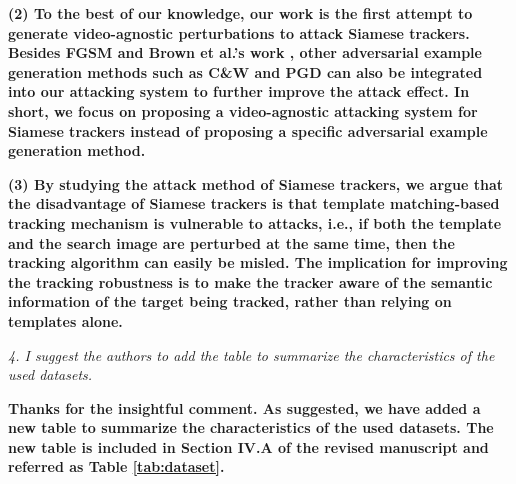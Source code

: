 \documentclass[12pt]{article}
\begin{document}
\textbf{
(2) To the best of our knowledge, our work is the first attempt to generate video-agnostic perturbations to attack Siamese trackers. Besides FGSM \cite{FGSM} and Brown et al.'s work \cite{patch}, other adversarial example generation methods such as C\&W \cite{carlini2017towards} and PGD \cite{PGD} can also be integrated into our attacking system to further improve the attack effect.
In short, we focus on proposing a video-agnostic attacking system for Siamese trackers instead of proposing a specific adversarial example generation method.}

\textbf{
(3) By studying the attack method of Siamese trackers, we argue that the disadvantage of Siamese trackers is that template matching-based tracking mechanism is vulnerable to attacks, i.e., if both the template and the search image are perturbed at the same time, then the tracking algorithm can easily be misled.
The implication for improving the tracking robustness is to make the tracker aware of the semantic information of the target being tracked, rather than relying on templates alone.}

\textit{4. I suggest the authors to add the table to summarize the characteristics of the used datasets.}

\textbf{Thanks for the insightful comment. As suggested, we have added a new table to summarize the characteristics of the used datasets.
The new table is included in Section IV.A of the revised manuscript and referred as Table \ref{tab:dataset}.}
\end{document}
